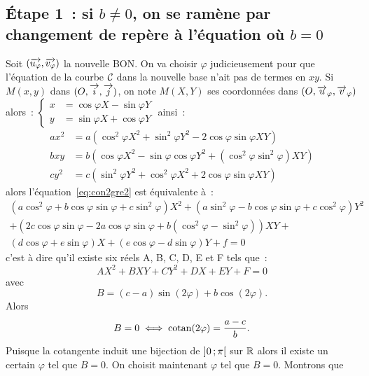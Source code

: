 \subsection{Étape 1~: si \(b\neq 0\), on se ramène par changement de repère à 
l'équation où \(b = 0\)}
Soit \((\overrightarrow{u_{\varphi}},\overrightarrow{v_{\varphi}})\) la nouvelle BON\@. On va 
choisir \(\varphi\) judicieusement pour que l'équation de la courbe 
\(\mathcal{C}_{{}}\) dans la nouvelle base n'ait pas de termes en \(xy\). Si 
\(M(x, y)\) dans \((O,\overrightarrow{i},\overrightarrow{j})\), on note \(M(X, Y)\) ses coordonnées dans 
\((O, \overrightarrow{u}_\varphi, \overrightarrow{v}_\varphi)\) alors~:
\(\begin{cases} x& = \cos\varphi X - \sin\varphi Y \\ y& = \sin\varphi X + 
\cos\varphi Y\end{cases}\) ainsi~:
\begin{align}
  ax^2& = a(\cos^2\varphi X^2 + \sin^2\varphi Y^2 - 2\cos\varphi\sin\varphi 
  XY)\\
  bxy& = b(\cos\varphi X^2 -\sin\varphi\cos\varphi Y^2 + (\cos^2\varphi 
  \sin^2\varphi)XY)\\
  cy^2& = c(\sin^2\varphi Y^2 + \cos^2\varphi X^2 + 2\cos\varphi\sin\varphi XY)
\end{align}
alors l'équation~\eqref{eq:con2gre2} est équivalente à~:
\begin{multline}
  (a\cos^2\varphi + b\cos\varphi\sin\varphi 
  +c\sin^2\varphi)X^2 + (a\sin^2\varphi - b\cos\varphi\sin\varphi 
  +c\cos^2\varphi)Y^2\\ + (2c\cos\varphi\sin\varphi-2a\cos\varphi\sin\varphi + b(\cos^2\varphi 
  - \sin^2\varphi))XY + \\ (d\cos\varphi + e\sin\varphi)X +(e\cos\varphi - 
  d\sin\varphi)Y +f = 0
\end{multline}
c'est à dire qu'il existe six réels A, B, C, D, E et F tels que~:
\begin{equation}
  AX^2 + BXY + CY^2 + DX + EY + F = 0 \label{eq:eqz}
\end{equation}
avec
\begin{equation}
  B = (c-a)\sin(2\varphi) + b\cos(2\varphi).
\end{equation}
Alors
\begin{equation}
  B = 0 \iff \operatorname{cotan}(2\varphi) = \frac{a-c}{b}.
\end{equation}
Puisque la cotangente induit une bijection de \(\left] 0 \, ; {} \pi \right[\) sur 
\(\mathbb{R}\) alors il existe un certain \(\varphi\) tel que \(B = 0\). On choisit 
maintenant \(\varphi\) tel que \(B = 0\). Montrons que 
